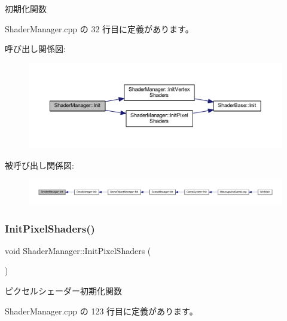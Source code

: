 初期化関数 



 Shader\+Manager.\+cpp の 32 行目に定義があります。

呼び出し関係図\+:\nopagebreak
\begin{figure}[H]
\begin{center}
\leavevmode
\includegraphics[width=350pt]{class_shader_manager_a8e8fd62a28cc18addcd5ec6507a5dcb0_cgraph}
\end{center}
\end{figure}
被呼び出し関係図\+:
\nopagebreak
\begin{figure}[H]
\begin{center}
\leavevmode
\includegraphics[width=350pt]{class_shader_manager_a8e8fd62a28cc18addcd5ec6507a5dcb0_icgraph}
\end{center}
\end{figure}
\mbox{\label{class_shader_manager_a6e1c2dc6c381081bc0e5ef1624b8e0f0}} 
\subsubsection{\texorpdfstring{Init\+Pixel\+Shaders()}{InitPixelShaders()}}
{\footnotesize\ttfamily void Shader\+Manager\+::\+Init\+Pixel\+Shaders (\begin{DoxyParamCaption}{ }\end{DoxyParamCaption})\hspace{0.3cm}{\ttfamily [private]}}



ピクセルシェーダー初期化関数 



 Shader\+Manager.\+cpp の 123 行目に定義があります。

